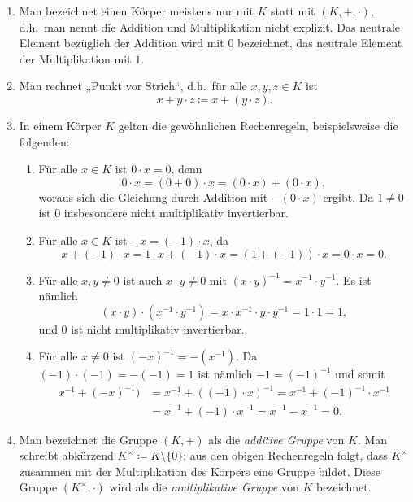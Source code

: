 \begin{bem}
 \begin{enumerate}[leftmargin=*]
  \item
   Man bezeichnet einen Körper meistens nur mit $K$ statt mit $(K,+,\cdot)$, d.h.\ man nennt die Addition und Multiplikation nicht explizit. Das neutrale Element bezüglich der Addition wird mit $0$ bezeichnet, das neutrale Element der Multiplikation mit $1$.
  \item
   Man rechnet „Punkt vor Strich“, d.h.\ für alle $x,y,z \in K$ ist
   \[
    x + y \cdot z \coloneqq x + (y \cdot z).
   \]
  \item
   In einem Körper $K$ gelten die gewöhnlichen Rechenregeln, beispielsweise die folgenden:
   \begin{enumerate}[label=\alph*)]
    \item
     Für alle $x \in K$ ist $0 \cdot x = 0$, denn
     \[
      0 \cdot x = (0+0) \cdot x = (0 \cdot x) + (0 \cdot x),
     \]
     woraus sich die Gleichung durch Addition mit $-(0 \cdot x)$ ergibt. Da $1 \neq 0$ ist $0$ insbesondere nicht multiplikativ invertierbar.
    \item
     Für alle $x \in K$ ist $-x = (-1) \cdot x$, da
     \[
      x + (-1) \cdot x
      = 1 \cdot x + (-1) \cdot x
      = (1 + (-1)) \cdot x
      = 0 \cdot x
      = 0.
     \]
    \item
     Für alle $x,y \neq 0$ ist auch $x \cdot y \neq 0$ mit $(x \cdot y)^{-1} = x^{-1} \cdot y^{-1}$. Es ist nämlich
     \[
      (x \cdot y) \cdot (x^{-1} \cdot y^{-1})
      = x \cdot x^{-1} \cdot y \cdot y^{-1}
      = 1 \cdot 1
      = 1,
     \]
     und $0$ ist nicht multiplikativ invertierbar.
    \item
     Für alle $x \neq 0$ ist $(-x)^{-1} = -(x^{-1})$. Da $(-1) \cdot (-1) = -(-1) = 1$ ist nämlich $-1 = (-1)^{-1}$ und somit
     \begin{align*}
      x^{-1} + (-x)^{-1})
      &= x^{-1} + ((-1) \cdot x)^{-1}
      = x^{-1} + (-1)^{-1} \cdot x^{-1} \\
      &= x^{-1} + (-1) \cdot x^{-1}
      = x^{-1} - x^{-1}
      = 0.
     \end{align*}
   \end{enumerate}
  \item
   Man bezeichnet die Gruppe $(K,+)$ als die \emph{additive Gruppe} von $K$. Man schreibt abkürzend $K^\times \coloneqq K\setminus\{0\}$; aus den obigen Rechenregeln folgt, dass $K^\times$ zusammen mit der Multiplikation des Körpers eine Gruppe bildet. Diese Gruppe $(K^\times,\cdot)$ wird als die \emph{multiplikative Gruppe} von $K$ bezeichnet.

\end{enumerate}
\end{bem}
